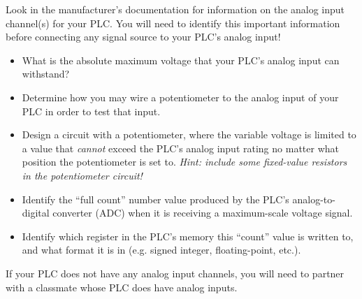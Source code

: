 

Look in the manufacturer's documentation for information on the analog input channel(s) for your PLC.  You will need to identify this important information before connecting any signal source to your PLC's analog input!

\vskip 10pt

\begin{itemize}
\item{} What is the absolute maximum voltage that your PLC's analog input can withstand?
\vskip 5pt
\item{} Determine how you may wire a potentiometer to the analog input of your PLC in order to test that input.
\vskip 5pt
\item{} Design a circuit with a potentiometer, where the variable voltage is limited to a value that {\it cannot} exceed the PLC's analog input rating no matter what position the potentiometer is set to.  {\it Hint: include some fixed-value resistors in the potentiometer circuit!}
\vskip 5pt
\item{} Identify the ``full count'' number value produced by the PLC's analog-to-digital converter (ADC) when it is receiving a maximum-scale voltage signal.
\vskip 5pt
\item{} Identify which register in the PLC's memory this ``count'' value is written to, and what format it is in (e.g. signed integer, floating-point, etc.).
\end{itemize}

\vskip 10pt

If your PLC does not have any analog input channels, you will need to partner with a classmate whose PLC does have analog inputs.


















